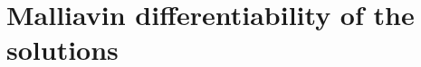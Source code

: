 \documentclass[11pt,a4paper]{article}
\newcommand{\E}{\mathbb{E}}
\theoremstyle{plain}
\begin{document}

\section{Malliavin differentiability of the solutions}
\label{sec: malliavin}
\end{document}
